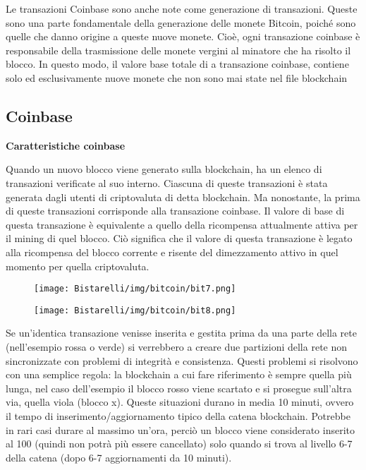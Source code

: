 \singlespacing

Le transazioni Coinbase sono anche note come generazione di transazioni. Queste sono una parte fondamentale
della generazione delle monete Bitcoin, poiché sono quelle che danno origine a queste nuove monete. Cioè, ogni
transazione coinbase è responsabile della trasmissione delle monete vergini al minatore che ha risolto il blocco.
In questo modo, il valore base totale di a transazione coinbase, contiene solo ed esclusivamente nuove monete
che non sono mai state nel file blockchain

\subsection{Coinbase}
\begin{center}
    \textbf{Caratteristiche coinbase}
\end{center}
Quando un nuovo blocco viene generato sulla blockchain, ha un elenco di transazioni verificate al suo interno.
Ciascuna di queste transazioni è stata generata dagli utenti di criptovaluta di detta blockchain. Ma nonostante, la
prima di queste transazioni corrisponde alla transazione coinbase. Il valore di base di questa transazione è
equivalente a quello della ricompensa attualmente attiva per il mining di quel blocco.
Ciò significa che il valore di questa transazione è legato alla ricompensa del blocco corrente e risente del
dimezzamento attivo in quel momento per quella criptovaluta.

\begin{figure}[H]
	\centering
    \texttt{[image: Bistarelli/img/bitcoin/bit7.png]}
\end{figure}

\begin{figure}[H]
	\centering
    \texttt{[image: Bistarelli/img/bitcoin/bit8.png]}
\end{figure}

Se un’identica transazione venisse inserita e gestita prima da una parte della rete (nell’esempio rossa o verde) si
verrebbero a creare due partizioni della rete non sincronizzate con problemi di integrità e consistenza. Questi
problemi si risolvono con una semplice regola: la blockchain a cui fare riferimento è sempre quella più lunga,
nel caso dell’esempio il blocco rosso viene scartato e si prosegue sull’altra via, quella viola (blocco x). Queste
situazioni durano in media 10 minuti, ovvero il tempo di inserimento/aggiornamento tipico della catena
blockchain. Potrebbe in rari casi durare al massimo un’ora, perciò un blocco viene considerato inserito al 100%
(quindi non potrà più essere cancellato) solo quando si trova al livello 6-7 della catena (dopo 6-7 aggiornamenti
da 10 minuti).

